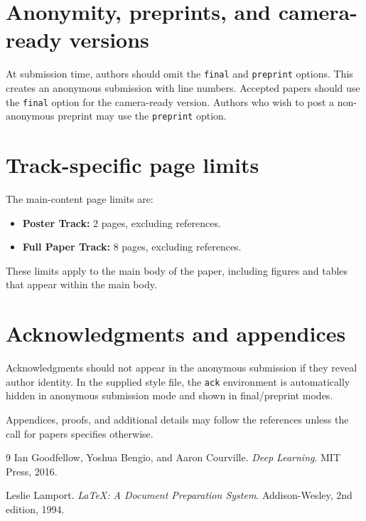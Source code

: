 \documentclass{article}
\begin{document}
\section{Anonymity, preprints, and camera-ready versions}
At submission time, authors should omit the \verb|final| and \verb|preprint| options. This creates an anonymous submission with line numbers. Accepted papers should use the \verb|final| option for the camera-ready version. Authors who wish to post a non-anonymous preprint may use the \verb|preprint| option.

\section{Track-specific page limits}
The main-content page limits are:
\begin{itemize}
    \item \textbf{Poster Track:} 2 pages, excluding references.
    \item \textbf{Full Paper Track:} 8 pages, excluding references.
\end{itemize}
These limits apply to the main body of the paper, including figures and tables that appear within the main body.

\section{Acknowledgments and appendices}
Acknowledgments should not appear in the anonymous submission if they reveal author identity. In the supplied style file, the \verb|ack| environment is automatically hidden in anonymous submission mode and shown in final/preprint modes.

Appendices, proofs, and additional details may follow the references unless the call for papers specifies otherwise.


\begin{thebibliography}{9}
Ian Goodfellow, Yoshua Bengio, and Aaron Courville.
\newblock \emph{Deep Learning}.
\newblock MIT Press, 2016.

Leslie Lamport.
\newblock \emph{\LaTeX: A Document Preparation System}.
\newblock Addison-Wesley, 2nd edition, 1994.
\end{thebibliography}
\end{document}
